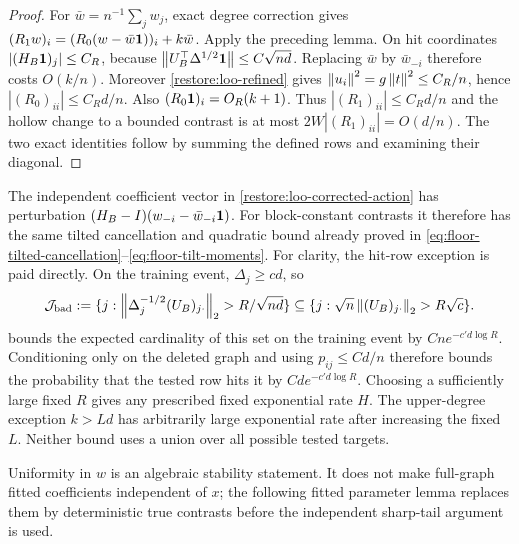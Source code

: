 \begin{proof}
For $\bar w=n^{-1}\sum_jw_j$, exact degree correction gives
$(R_1w)_i=(R_0(w-\bar w\mathbf 1))_i+k\bar w$.
Apply the preceding lemma. On hit coordinates $|(H_B\mathbf 1)_j|\le C_R$,
because $\left\lVert U_B^\top\Delta^{1/2}\mathbf 1\right\rVert\le C\sqrt{nd}$.
Replacing $\bar w$ by $\bar w_{-i}$ therefore costs $O(k/n)$.
Moreover \eqref{restore:loo-refined} gives
$\left\lVert u_i\right\rVert^2=g\left\lVert t\right\rVert^2\le C_R/n$, hence
$|(R_0)_{ii}|\le C_Rd/n$. Also $(R_0\mathbf 1)_i=O_R(k+1)$.
Thus $|(R_1)_{ii}|\le C_Rd/n$ and the hollow change to a bounded
contrast is at most $2W|(R_1)_{ii}|=O(d/n)$. The two exact identities
follow by summing the defined rows and examining their diagonal.
\end{proof}

The independent coefficient vector in
\eqref{restore:loo-corrected-action} has perturbation
$(H_B-I)(w_{-i}-\bar w_{-i}\mathbf 1)$. For block-constant contrasts it
therefore has the same tilted cancellation and quadratic bound already
proved in \eqref{eq:floor-tilted-cancellation}--\eqref{eq:floor-tilt-moments}.
For clarity, the hit-row exception is paid directly. On the
training event, $\Delta_j\ge c d$, so
\[
 \mathcal J_{\rm bad}
 :=\{j:\left\lVert\Delta_j^{-1/2}(U_B)_{j\cdot}\right\rVert_2
                          >R/\sqrt{nd}\}
 \subseteq
 \{j:\sqrt n\left\lVert(U_B)_{j\cdot}\right\rVert_2>R\sqrt c\}.
\]
 bounds the expected cardinality of
this set on the training event by $Cn e^{-c'd\log R}$.
Conditioning only on the deleted graph and using $p_{ij}\le Cd/n$
therefore bounds the probability that the tested row hits it by
$Cd e^{-c'd\log R}$. Choosing a sufficiently large fixed $R$
gives any prescribed fixed exponential rate $H$.
The upper-degree exception $k>Ld$ has arbitrarily large exponential
rate after increasing the fixed $L$. Neither bound uses a union over
all possible tested targets.

Uniformity in $w$ is an algebraic stability statement. It does not make
full-graph fitted coefficients independent of $x$; the following fitted
parameter lemma replaces them by deterministic true contrasts before
the independent sharp-tail argument is used.
